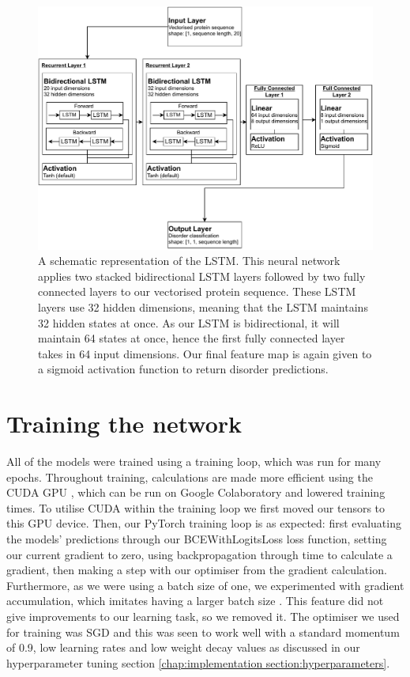 \documentclass{l4proj}
\begin{document}
\begin{figure}[!ht]
    \centering
    \includegraphics[width=0.95\linewidth]{images/RNNdraw.pdf}    

    \caption{A schematic representation of the LSTM. This neural network applies two stacked bidirectional LSTM layers followed by two fully connected layers to our vectorised protein sequence. These LSTM layers use 32 hidden dimensions, meaning that the LSTM maintains 32 hidden states at once. As our LSTM is bidirectional, it will maintain 64 states at once, hence the first fully connected layer takes in 64 input dimensions. Our final feature map is again given to a sigmoid activation function to return disorder predictions.}

    \label{fig:RNN} 
\end{figure}

\section{Training the network}

All of the models were trained using a training loop, which was run for many epochs. Throughout training, calculations are made more efficient using the CUDA GPU \citep{Nickolls:08}, which can be run on Google Colaboratory and lowered training times. To utilise CUDA within the training loop we first moved our tensors to this GPU device. Then, our PyTorch training loop is as expected: first evaluating the models' predictions through our BCEWithLogitsLoss loss function, setting our current gradient to zero, using backpropagation through time to calculate a gradient, then making a step with our optimiser from the gradient calculation. Furthermore, as we were using a batch size of one, we experimented with gradient accumulation, which imitates having a larger batch size \citep{Bhattacharyya:20}. This feature did not give improvements to our learning task, so we removed it. The optimiser we used for training was SGD and this was seen to work well with a standard momentum of 0.9, low learning rates and low weight decay values as discussed in our hyperparameter tuning section \ref{chap:implementation section:hyperparameters}.
\end{document}
